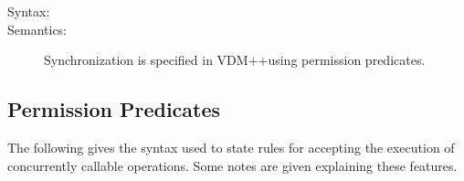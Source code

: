 \documentclass[\pformat,12pt]{article}
\newcommand{\vdmpp}{VDM++}
\begin{document}
\begin{description}
\item[Syntax:] 

\item[Semantics:] 

Synchronization is specified in \vdmpp using permission predicates.

\end{description}


\subsection{Permission Predicates}
\label{sec:permissionpred}

The following gives the syntax used to state
rules for accepting the execution of concurrently callable operations.
Some notes are given explaining these features.
\end{document}
